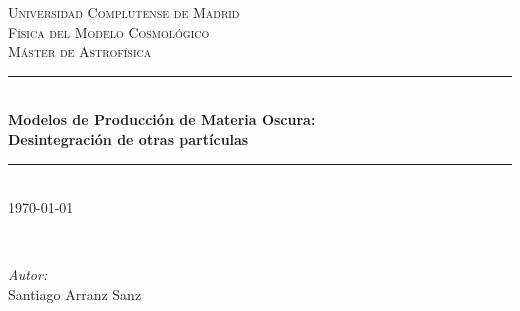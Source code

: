 \documentclass[11pt]{article}
\begin{document}

\begin{titlepage} %
	\newcommand{\HRule}{\rule{\linewidth}{0.5mm}} %
	
	\center %
	
	
	\textsc{\LARGE Universidad Complutense de Madrid}\\[1.5cm] %
	
	\textsc{\Large Física del Modelo Cosmológico}\\[0.5cm] %
	
	\textsc{\large Máster de Astrofísica}\\[0.5cm] %
	
	
	\HRule\\[0.4cm]
	
	{\LARGE\bfseries Modelos de Producción de Materia Oscura:\\[0.3cm]
	Desintegración de otras partículas}\\[0.4cm] %
	
	\HRule\\[1.5cm]
	{\large\today} 
	
	\vspace{8.5cm}
	\begin{minipage}{0.4\textwidth}
		\begin{flushleft}
			
		\end{flushleft}
	\end{minipage}
	~
	\begin{minipage}{0.4\textwidth}
		\begin{flushright}
			\large
			\textit{Autor:}\\
			Santiago Arranz Sanz %
		\end{flushright}
	\end{minipage}
	

\end{titlepage}
\end{document}
